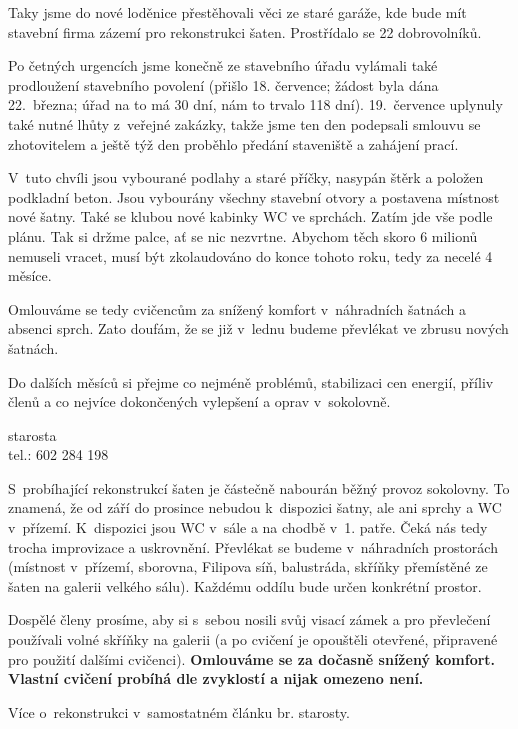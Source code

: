 \documentclass[11pt]{article}
\begin{document}
Taky jsme do nové loděnice přestěhovali věci ze staré garáže, kde bude mít stavební firma zázemí pro rekonstrukci šaten. Prostřídalo se 22 dobrovolníků. 

Po četných urgencích jsme konečně ze stavebního úřadu vylámali také prodloužení stavebního povolení (přišlo 18. července; žádost byla dána 22.~března; úřad na to má 30 dní, nám to trvalo 118 dní). 19.~července uplynuly také nutné lhůty z~veřejné zakázky, takže jsme ten den podepsali smlouvu se zhotovitelem a ještě týž den proběhlo předání staveniště a zahájení prací.

V~tuto chvíli jsou vybourané podlahy a staré příčky, nasypán štěrk a položen podkladní beton. Jsou vybourány všechny stavební otvory a postavena místnost nové šatny. Také se klubou nové kabinky WC ve sprchách. Zatím jde vše podle plánu. Tak si držme palce, ať se nic nezvrtne. Abychom těch skoro 6 milionů nemuseli vracet, musí být zkolaudováno do konce tohoto roku, tedy za necelé 4 měsíce.

Omlouváme se tedy cvičencům za snížený komfort v~náhradních šatnách a absenci sprch. Zato doufám, že se již v~lednu budeme převlékat ve zbrusu nových šatnách.

\clearpage
Do dalších měsíců si přejme co nejméně problémů, stabilizaci cen energií, příliv členů a co nejvíce dokončených vylepšení a oprav v~sokolovně.


\signature{Jiří Novák (Jirkan)}{starosta\\tel.: 602 284 198}

\vspace*{24pt}

S~probíhající rekonstrukcí šaten je částečně nabourán běžný provoz sokolovny. To znamená, že od září do prosince nebudou k~dispozici šatny, ale ani sprchy a WC v~přízemí. K~dispozici jsou WC v~sále a na chodbě v~1. patře. Čeká nás tedy trocha improvizace a uskrovnění. Převlékat se budeme v~náhradních prostorách (místnost v~přízemí, sborovna, Filipova síň, balustráda, skříňky přemístěné ze šaten na galerii velkého sálu). Každému oddílu bude určen konkrétní prostor.

Dospělé členy prosíme, aby si s~sebou nosili svůj visací zámek a pro převlečení používali volné skříňky na galerii (a po cvičení je opouštěli otevřené, připravené pro použití dalšími cvičenci). \textbf{Omlouváme se za dočasně snížený komfort. Vlastní cvičení probíhá dle zvyklostí a nijak omezeno není.}

Více o~rekonstrukci v~samostatném článku br. starosty.
\end{document}
